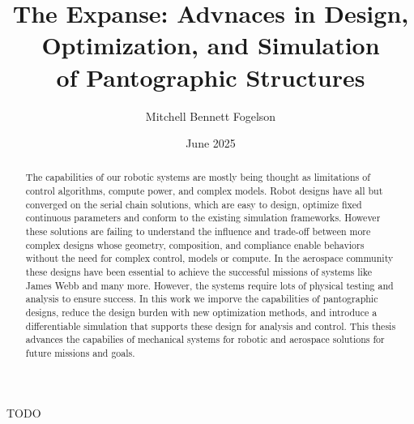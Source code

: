 \documentclass[12pt]{cmuthesis}
\begin{document}
\frontmatter

\pagestyle{empty}

\title{{\bf The Expanse: Advnaces in Design, Optimization, and Simulation\\ of Pantographic Structures}}
\author{Mitchell Bennett Fogelson}
\date{June 2025}


\support{}
\disclaimer{}


\maketitle

\begin{dedication}
  TODO
\end{dedication}

\begin{abstract}
The capabilities of our robotic systems are mostly being thought as limitations of control algorithms, compute power, and complex models. Robot designs have all but converged on the serial chain solutions, which are easy to design, optimize fixed continuous parameters and conform to the existing simulation frameworks. However these solutions are failing to understand the influence and trade-off between more complex designs whose geometry, composition, and compliance enable behaviors without the need for complex control, models or compute. In the aerospace community these designs have been essential to achieve the successful missions of systems like James Webb and many more. However, the systems require lots of physical testing and analysis to ensure success. In this work we imporve the capabilities of pantographic designs, reduce the design burden with new optimization methods, and introduce a differentiable simulation that supports these design for analysis and control. This thesis advances the capabilies of mechanical systems for robotic and aerospace solutions for future missions and goals. 
\end{abstract}
\end{document}
